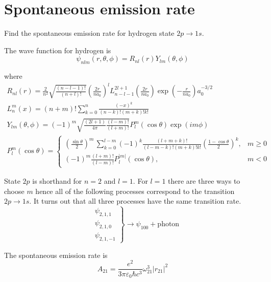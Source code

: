 

\section*{Spontaneous emission rate}

Find the spontaneous emission rate for hydrogen state $2p\rightarrow1s$.

\bigskip
The wave function for hydrogen is
\begin{equation*}
\psi_{nlm}(r,\theta,\phi)=R_{nl}(r)Y_{lm}(\theta,\phi)
\end{equation*}

where
\begin{gather*}
R_{nl}(r)=
\frac{2}{n^2}
\sqrt{\frac{(n-l-1)!}{(n+l)!}}
\left(\frac{2r}{na_0}\right)^l
L_{n-l-1}^{2l+1}\left(\frac{2r}{na_0}\right)
\exp\left(-\frac{r}{na_0}\right)
a_0^{-3/2}
\\[1ex]
L_n^m(x)=(n+m)!\sum_{k=0}^n\frac{(-x)^k}{(n-k)!(m+k)!k!}
\\[1ex]
Y_{lm}(\theta,\phi)=(-1)^m
\sqrt{\frac{(2l+1)}{4\pi}
\frac{(l-m)!}{(l+m)!}}
P_l^m(\cos\theta)\exp(im\phi)
\\[1ex]
P_l^m(\cos\theta)=\begin{cases}
\displaystyle
\left(\frac{\sin\theta}{2}\right)^m\,\sum_{k=0}^{l-m}
(-1)^k\frac{(l+m+k)!}{(l-m-k)!(m+k)!k!}
\left(\frac{1-\cos\theta}{2}\right)^k, & m\ge0
\\[3ex]
\displaystyle
(-1)^m\frac{(l+m)!}{(l-m)!}P_l^{|m|}(\cos\theta), & m<0
\end{cases}
\end{gather*}

State $2p$ is shorthand for $n=2$ and $l=1$.
For $l=1$ there are three ways to choose $m$ hence all of the following processes correspond to the transition
$2p\rightarrow1s$.
It turns out that all three processes have the same transition rate.
\begin{equation*}
\left.\begin{aligned}
&\psi_{2,1,1}
\\
&\psi_{2,1,0}
\\
&\psi_{2,1,-1}
\end{aligned}\right\}\rightarrow\psi_{100}+\text{photon}
\end{equation*}

The spontaneous emission rate is
\begin{equation*}
A_{21}=\frac{e^2}{3\pi\varepsilon_0\hbar c^3}\omega_{21}^3|r_{21}|^2
\end{equation*}

